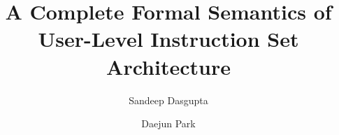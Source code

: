 \documentclass[sigplan,screen]{acmart}
\begin{document}


%
\title[\ISA Semantics]{A Complete Formal Semantics of \ISA User-Level Instruction Set Architecture}

%


\author{Sandeep Dasgupta}

\author{Daejun Park}
\end{document}
